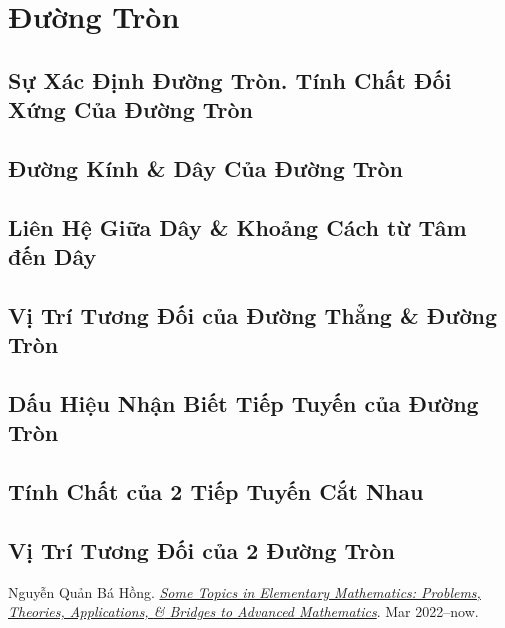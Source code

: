 \documentclass{article}
\numberwithin{equation}{section}
\begin{document}
\section{Đường Tròn}

\subsection{Sự Xác Định Đường Tròn. Tính Chất Đối Xứng Của Đường Tròn}

\subsection{Đường Kính \& Dây Của Đường Tròn}

\subsection{Liên Hệ Giữa Dây \& Khoảng Cách từ Tâm đến Dây}

\subsection{Vị Trí Tương Đối của Đường Thẳng \& Đường Tròn}

\subsection{Dấu Hiệu Nhận Biết Tiếp Tuyến của Đường Tròn}

\subsection{Tính Chất của 2 Tiếp Tuyến Cắt Nhau}

\subsection{Vị Trí Tương Đối của 2 Đường Tròn}


\begin{thebibliography}{99}
	 Nguyễn Quản Bá Hồng. \href{https://github.com/NQBH/hobby/blob/master/elementary_mathematics/NQBH_elementary_mathematics.pdf}{\textit{Some Topics in Elementary Mathematics: Problems, Theories, Applications, \textit{\&} Bridges to Advanced Mathematics}}. Mar 2022--now.
\end{thebibliography}


\printbibliography[heading=bibintoc]
	
\end{document}
